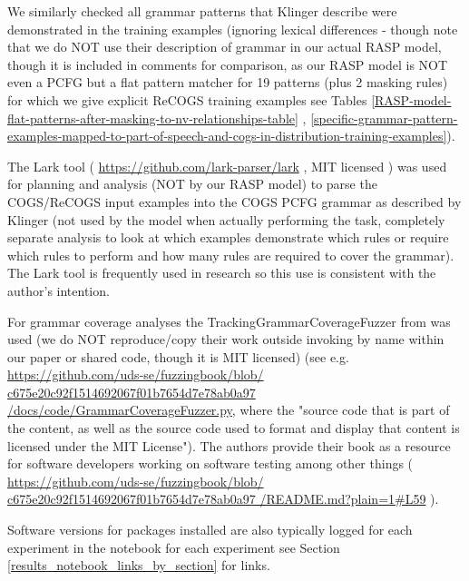 \documentclass[11pt]{article}
\begin{document}
We similarly checked all grammar patterns that Klinger describe were demonstrated in the training examples  (ignoring lexical differences - though note that we do NOT use their description of grammar in our actual RASP model, though it is included in comments for comparison, as our RASP model is NOT even a PCFG but a flat pattern matcher for 19 patterns (plus 2 masking rules) for which we give explicit ReCOGS training examples see Tables \ref{RASP-model-flat-patterns-after-masking-to-nv-relationships-table} , \ref{specific-grammar-pattern-examples-mapped-to-part-of-speech-and-cogs-in-distribution-training-examples}). 

The Lark tool ( \href{https://github.com/lark-parser/lark}{https://github.com/lark-parser/lark} , MIT licensed ) was used for planning and analysis (NOT by our RASP model) to parse the COGS/ReCOGS input examples into the COGS PCFG grammar as described by Klinger (not used by the model when actually performing the task, completely separate analysis to look at which examples demonstrate which rules or require which rules to perform and how many rules are required to cover the grammar). The Lark tool is frequently used in research so this use is consistent with the author's intention.

For grammar coverage analyses the TrackingGrammarCoverageFuzzer from \cite{fuzzingbook2023:GrammarCoverageFuzzer} was used (we do NOT reproduce/copy their work outside invoking by name within our paper or shared code, though it is MIT licensed) (see e.g. \href{https://github.com/uds-se/fuzzingbook/blob/c675e20c92f1514692067f01b7654d7e78ab0a97/docs/code/GrammarCoverageFuzzer.py}{https://github.com/uds-se/fuzzingbook/blob/
c675e20c92f1514692067f01b7654d7e78ab0a97
/docs/code/GrammarCoverageFuzzer.py}, where the "source code that is part of the content, as well as the source code used to format and display that content is licensed under the MIT License"). The authors \cite{fuzzingbook2023:GrammarCoverageFuzzer} provide their book as a resource for software developers working on software testing among other things ( \href{https://github.com/uds-se/fuzzingbook/blob/c675e20c92f1514692067f01b7654d7e78ab0a97/README.md?plain=1#L59}{https://github.com/uds-se/fuzzingbook/blob/
c675e20c92f1514692067f01b7654d7e78ab0a97
/README.md?plain=1\#L59} ).

Software versions for packages installed are also typically logged for each experiment in the notebook for each experiment see Section \ref{results_notebook_links_by_section} for links.
\end{document}
